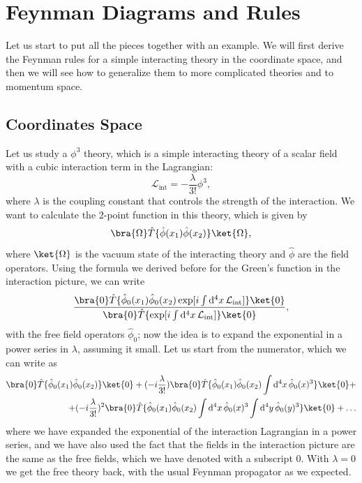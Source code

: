 \section{Feynman Diagrams and Rules}

Let us start to put all the pieces together with an example. We will first derive the Feynman rules for a simple interacting theory in the coordinate space, and then we will see how to generalize them to more complicated theories and to momentum space.

\subsection{Coordinates Space}

\begin{example}
    Let us study a \(\phi^3\) theory, which is a simple interacting theory of a scalar field with a cubic interaction term in the Lagrangian:
    \[
        \mathcal{L}_{\text{int}} = - \frac{\lambda}{3!} \phi^3,
    \]
    where \(\lambda\) is the coupling constant that controls the strength of the interaction. We want to calculate the 2-point function in this theory, which is given by
    \[
        \bra{\Omega} \hat{T} \{ \hat{\phi} (x_1) \hat{\phi} (x_2) \} \ket{\Omega},
    \]
    where \(\ket{\Omega}\) is the vacuum state of the interacting theory and \(\hat{\phi}\) are the field operators. Using the formula we derived before for the Green's function in the interaction picture, we can write
    \[
        \frac{\bra{0} \hat{T} \{ \hat{\phi}_0 (x_1) \hat{\phi}_0 (x_2) \exp[ i \int \mathrm{d}^4 x \, \mathcal{L}_{\text{int}} ] \} \ket{0}}{\bra{0} \hat{T} \{ \exp[ i \int \mathrm{d}^4 x \, \mathcal{L}_{\text{int}} ] \} \ket{0}},
    \]
    with the free field operators \(\hat{\phi}_0\); now the idea is to expand the exponential in a power series in \(\lambda\), assuming it small. Let us start from the numerator, which we can write as
    \[
        \begin{aligned}
            \bra{0} \hat{T} \{ \hat{\phi}_0 (x_1) \hat{\phi}_0 (x_2) \} \ket{0} + (-i \frac{\lambda}{3!}) \bra{0} \hat{T} \{ \hat{\phi}_0 (x_1) \hat{\phi}_0 (x_2) \int \mathrm{d}^4 x \, \hat{\phi}_0(x)^3\} \ket{0} + \\
            + (-i \frac{\lambda}{3!})^2 \bra{0} \hat{T} \{ \hat{\phi}_0 (x_1) \hat{\phi}_0 (x_2) \int \mathrm{d}^4 x \, \hat{\phi}_0(x)^3 \int \mathrm{d}^4 y \, \hat{\phi}_0(y)^3 \} \ket{0} + \dots
        \end{aligned}
    \]
    where we have expanded the exponential of the interaction Lagrangian in a power series, and we have also used the fact that the fields in the interaction picture are the same as the free fields, which we have denoted with a subscript \(0\).
    With \(\lambda=0\) we get the free theory back, with the usual Feynman propagator as we expected.


\end{example}

